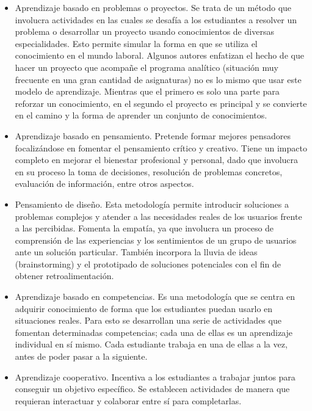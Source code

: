 \documentclass[conference]{IEEEtran}
\begin{document}
\begin{itemize}
    \item Aprendizaje basado en problemas o proyectos. Se trata de un método que involucra actividades en las cuales se desafía a los estudiantes a resolver un problema o desarrollar un proyecto usando conocimientos de diversas especialidades. Esto permite simular la forma en que se utiliza el conocimiento en el mundo laboral. Algunos autores enfatizan el hecho de que hacer un proyecto que acompañe el programa analítico (situación muy frecuente en una gran cantidad de asignaturas) no es lo mismo que usar este modelo de aprendizaje. Mientras que el primero es solo una parte para reforzar un conocimiento, en el segundo el proyecto es principal y se convierte en el camino y la forma de aprender un conjunto de conocimientos.

    \item Aprendizaje basado en pensamiento. Pretende formar mejores pensadores focalizándose en fomentar el pensamiento crítico y creativo. Tiene un impacto completo en mejorar el bienestar profesional y personal, dado que involucra en su proceso la toma de decisiones, resolución de problemas concretos, evaluación de información, entre otros aspectos. 

    \item Pensamiento de diseño. Esta metodología permite introducir soluciones a problemas complejos y atender a las necesidades reales de los usuarios frente a las percibidas. Fomenta la empatía, ya que involucra un proceso de comprensión de las experiencias y los sentimientos de un grupo de usuarios ante un solución particular. También incorpora la lluvia de ideas (brainstorming) y el prototipado de soluciones potenciales con el fin de obtener retroalimentación.

    \item Aprendizaje basado en competencias.  Es una metodología que se centra en adquirir conocimiento de forma que los estudiantes puedan usarlo en situaciones reales.  Para esto se desarrollan una serie de actividades que fomentan determinadas competencias; cada una de ellas es un aprendizaje individual en sí mismo. Cada estudiante trabaja en una de ellas a la vez, antes de poder pasar a la siguiente.

    \item Aprendizaje cooperativo. Incentiva a los estudiantes a trabajar juntos para conseguir un objetivo específico. Se establecen actividades de manera que requieran interactuar y colaborar entre sí para completarlas.


\end{itemize}
\end{document}
